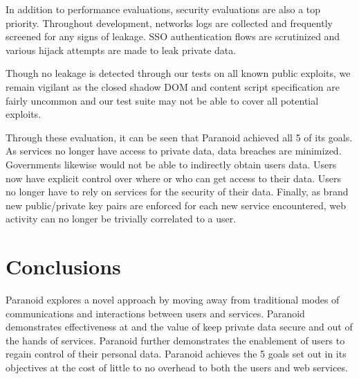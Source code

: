 \documentclass[letterpaper,twocolumn,10pt]{article}
\begin{document}
In addition to performance evaluations, security evaluations are also a top priority. Throughout development, networks logs are collected and frequently screened for any signs of leakage. SSO authentication flows are scrutinized and various hijack attempts are made to leak private data.  

Though no leakage is detected through our tests on all known public exploits, we remain vigilant as the closed shadow DOM and content script specification are fairly uncommon and our test suite may not be able to cover all potential exploits.

Through these evaluation, it can be seen that Paranoid achieved all 5 of its goals. As services no longer have access to private data, data breaches are minimized. Governments likewise would not be able to indirectly obtain users data. Users now have explicit control over where or who can get access to their data. Users no longer have to rely on services for the security of their data. Finally, as brand new public/private key pairs are enforced for each new service encountered, web activity can no longer be trivially correlated to a user.

\section{Conclusions}

Paranoid explores a novel approach by moving away from traditional modes of communications and interactions between users and services. Paranoid demonstrates effectiveness at and the value of keep private data secure and out of the hands of services. Paranoid further demonstrates the enablement of users to regain control of their personal data. Paranoid achieves the 5 goals set out in its objectives at the cost of little to no overhead to both the users and web services. 





\end{document}
